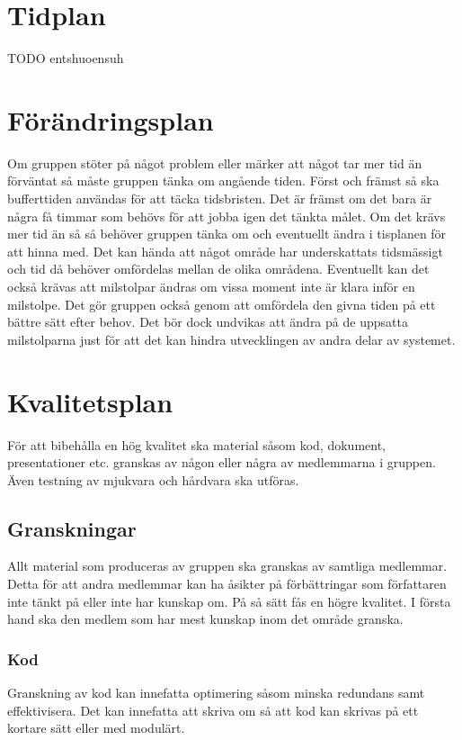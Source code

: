 \documentclass[projektplan/plan.tex]{subfiles}
\begin{document}
\section{Tidplan}
TODO entshuoensuh

\section{Förändringsplan}
Om gruppen stöter på något problem eller märker att något tar mer tid än
förväntat så måste gruppen tänka om angående tiden. Först och främst så ska
bufferttiden användas för att täcka tidsbristen. Det är främst om det bara är
några få timmar som behövs för att jobba igen det tänkta målet. Om det krävs
mer tid än så så behöver gruppen tänka om och eventuellt ändra i tisplanen för
att hinna med. Det kan hända att något område har underskattats tidsmässigt och
tid då behöver omfördelas mellan de olika områdena. Eventuellt kan det också
krävas att milstolpar ändras om vissa moment inte är klara inför en milstolpe.
Det gör gruppen också genom att omfördela den givna tiden på ett bättre sätt
efter behov. Det bör dock undvikas att ändra på de uppsatta milstolparna just
för att det kan hindra utvecklingen av andra delar av systemet.

\section{Kvalitetsplan}
För att bibehålla en hög kvalitet ska material såsom kod, dokument,
presentationer etc. granskas av någon eller några av medlemmarna i gruppen.
Även testning av mjukvara och hårdvara ska utföras.

\subsection{Granskningar}
Allt material som produceras av gruppen ska granskas av samtliga medlemmar.
Detta för att andra medlemmar kan ha åsikter på förbättringar som författaren
inte tänkt på eller inte har kunskap om. På så sätt fås en högre kvalitet. I
första hand ska den medlem som har mest kunskap inom det område granska.

\subsubsection{Kod}	
Granskning av kod kan innefatta optimering såsom minska redundans samt
effektivisera. Det kan innefatta att skriva om så att kod kan skrivas på ett
kortare sätt eller med modulärt.
\end{document}
